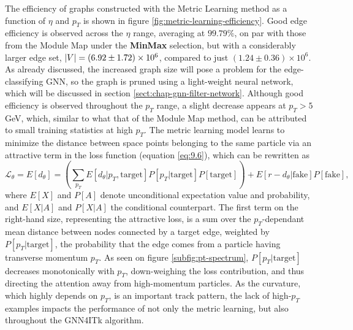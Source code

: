 The efficiency of graphs constructed with the Metric Learning method as a function of $\eta$ and $p_T$ is shown in figure \ref{fig:metric-learning-efficiency}. 
Good edge efficiency is observed across the $\eta$ range, averaging at $99.79\%$, on par with those from the Module Map under the \textbf{MinMax} selection, but with a considerably larger edge set, $\abs{V} = (6.92\pm 1.72)\times 10^6$, compared to just $(1.24\pm 0.36)\times 10^6$. 
As already discussed, the increased graph size will pose a problem for the edge-classifying GNN, so the graph is pruned using a light-weight neural network, which will be discussed in section \ref{sect:chap-gnn-filter-network}.
Although good efficiency is observed throughout the $p_T$ range, a slight decrease appears at $p_T>5$ GeV, which, similar to what that of the Module Map method, can be attributed to small training statistics at high $p_T$.
The metric learning model learns to minimize the distance between space points belonging to the same particle via an attractive term in the loss function (equation \eqref{eq:9.6}), which can be rewritten as
\begin{equation}
    \label{eq:9.8}
\mathcal{L}_{\theta} = E[d_\theta] =   \left( \sum_{p_T} E[d_{\theta} | p_T, \mathrm{target}] P[p_T|\mathrm{target}] P[\mathrm{target}] \right)  +  E[r-d_{\theta}|\mathrm{fake}] P[\mathrm{fake}],
\end{equation}
where $E[X]$ and $P[A]$ denote unconditional expectation value and probability, and $E[X|A]$ and $P[X|A]$ the conditional counterpart. 
The first term on the right-hand size, representing the attractive loss, is a sum over the $p_T$-dependant mean distance between nodes connected by a target edge, weighted by $P[p_T|\mathrm{target}]$, the probability that the edge comes from a particle having transverse momentum $p_T$.
As seen on figure \ref{subfig:pt-spectrum}, $P[p_T|\mathrm{target}]$ decreases monotonically with $p_T$, down-weighing the loss contribution, and thus directing the attention away from high-momentum particles.
As the curvature, which highly depends on $p_T$, is an important track pattern, the lack of high-$p_T$ examples impacts the performance of not only the metric learning, but also throughout the GNN4ITk algorithm.

